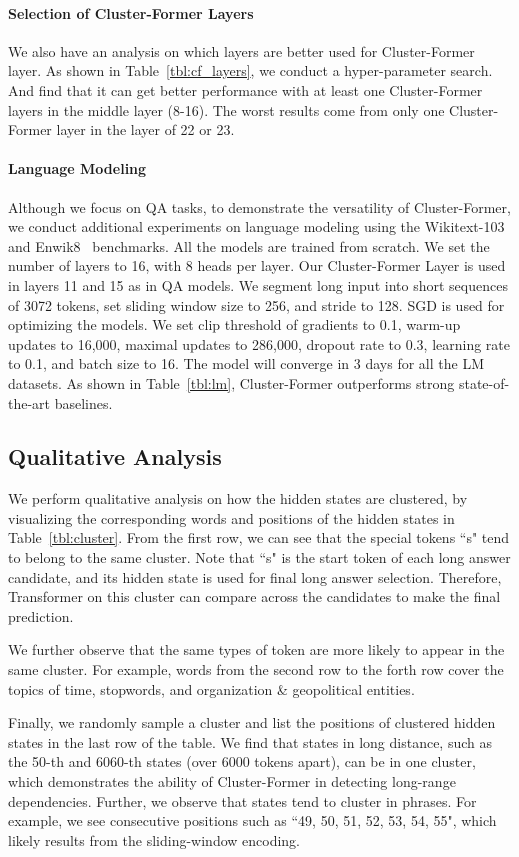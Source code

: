 \paragraph{Selection of Cluster-Former Layers}
We also have an analysis on which layers are better used for Cluster-Former layer. As shown in Table~\ref{tbl:cf_layers}, we conduct a hyper-parameter search. And find that it can get better performance with at least one Cluster-Former layers in the middle layer (8-16). The worst results come from only one Cluster-Former layer in the layer of 22 or 23. 



\paragraph{Language Modeling}
Although we focus on QA tasks, to demonstrate the versatility of Cluster-Former, we conduct additional experiments on language modeling using the Wikitext-103~\citep{merity2016pointer} and Enwik8~\citep{mahoney2011large} benchmarks. 
All the models are trained from scratch.
We set the number of layers to 16, with 8 heads per layer.
Our Cluster-Former Layer is used in layers 11 and 15 as in QA models. 
We segment long input into short sequences of 3072 tokens, set sliding window size  to 256, and stride  to 128.
SGD is used for optimizing the models.
We set clip threshold of gradients to 0.1, warm-up updates to 16,000, maximal updates to 286,000, dropout rate to 0.3, learning rate to 0.1, and batch size to 16.
The model will converge in 3 days for all the LM datasets.
As shown in Table~\ref{tbl:lm}, Cluster-Former outperforms strong state-of-the-art baselines.


\subsection{Qualitative Analysis}

We perform qualitative analysis on how the hidden states are clustered,
by visualizing the corresponding words and positions of the hidden states in Table~\ref{tbl:cluster}.
From the first row, we can see that the special tokens ``s" tend to belong to the same cluster. 
Note that ``s" is the start token of each long answer candidate, and its hidden state is used for final long answer selection.
Therefore, Transformer on this cluster can compare across the candidates to make the final prediction.

We further observe that the same types of token are more likely to appear in the same cluster. 
For example, words from the second row to the forth row cover the topics of time, stopwords, and organization \& geopolitical entities.

Finally, we randomly sample a cluster and list the positions of clustered hidden states in the last row of the table. 
We find that states in long distance, such as the 50-th and 6060-th states (over 6000 tokens apart), can be in one cluster, which demonstrates the ability of Cluster-Former in detecting long-range dependencies. Further, we observe that states tend to cluster in phrases. 
For example, we see consecutive positions such as ``49, 50, 51, 52, 53, 54, 55", which likely results from the sliding-window encoding.


